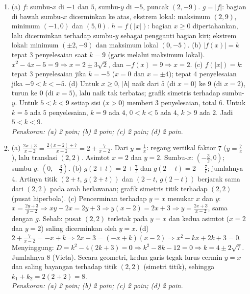 \documentclass[a4paper,11pt]{article}
\begin{document}
\begin{enumerate}[leftmargin=2em,itemsep=3pt,topsep=2pt]
\item[\textbf{3.}] (a) $f$: sumbu-$x$ di $-1$ dan $5$, sumbu-$y$ di $-5$, puncak $(2,-9)$. $g=|f|$: bagian di bawah sumbu-$x$ dicerminkan ke atas, ekstrem lokal: maksimum $(2,9)$, minimum $(-1,0)$ dan $(5,0)$. $h=f(|x|)$: bagian $x\ge0$ dipertahankan, lalu dicerminkan terhadap sumbu-$y$ sebagai pengganti bagian kiri; ekstrem lokal: minimum $(\pm2,-9)$ dan maksimum lokal $(0,-5)$. (b) $|f(x)|=k$ tepat $3$ penyelesaian saat $k=9$ (garis melalui maksimum lokal). $x^2-4x-5=9\Rightarrow x=2\pm3\sqrt2$, dan $-f(x)=9\Rightarrow x=2$. (c) $f(|x|)=k$: tepat $3$ penyelesaian jika $k=-5$ ($x=0$ dan $x=\pm4$); tepat $4$ penyelesaian jika $-9<k<-5$. (d) Untuk $x\ge0$, $|h|$ naik dari $5$ (di $x=0$) ke $9$ (di $x=2$), turun ke $0$ (di $x=5$), lalu naik tak terbatas; grafik simetris terhadap sumbu-$y$. Untuk $5<k<9$ setiap sisi ($x>0$) memberi $3$ penyelesaian, total $6$. Untuk $k=5$ ada $5$ penyelesaian, $k=9$ ada $4$, $0<k<5$ ada $4$, $k>9$ ada $2$. Jadi $5<k<9$. \\ \textit{Penskoran: (a) 2 poin; (b) 2 poin; (c) 2 poin; (d) 2 poin.}
\item[\textbf{4.}] (a) $\frac{2x+3}{x-2}=\frac{2(x-2)+7}{x-2}=2+\frac7{x-2}$. Dari $y=\frac1x$: regang vertikal faktor $7$ ($y=\frac7x$), lalu translasi $(2,2)$. Asimtot $x=2$ dan $y=2$. Sumbu-$x$: $\left(-\frac32,0\right)$; sumbu-$y$: $\left(0,-\frac32\right)$. (b) $g(2+t)=2+\frac7t$ dan $g(2-t)=2-\frac7t$; jumlahnya $4$. Artinya titik $(2+t,\,g(2+t))$ dan $(2-t,\,g(2-t))$ berjarak sama dari $(2,2)$ pada arah berlawanan; grafik simetris titik terhadap $(2,2)$ (pusat hiperbola). (c) Pencerminan terhadap $y=x$ menukar $x$ dan $y$: $x=\frac{2y+3}{y-2}\Rightarrow xy-2x=2y+3\Rightarrow y(x-2)=2x+3\Rightarrow y=\frac{2x+3}{x-2}$, sama dengan $g$. Sebab: pusat $(2,2)$ terletak pada $y=x$ dan kedua asimtot ($x=2$ dan $y=2$) saling dicerminkan oleh $y=x$. (d) $2+\frac7{x-2}=-x+k\Rightarrow2x+3=(-x+k)(x-2)\Rightarrow x^2-kx+2k+3=0$. Menyinggung: $D=k^2-4(2k+3)=0\Rightarrow k^2-8k-12=0\Rightarrow k=4\pm2\sqrt7$. Jumlahnya $8$ (Vieta). Secara geometri, kedua garis tegak lurus cermin $y=x$ dan saling bayangan terhadap titik $(2,2)$ (simetri titik), sehingga $k_1+k_2=2(2+2)=8$. \\ \textit{Penskoran: (a) 2 poin; (b) 2 poin; (c) 2 poin; (d) 2 poin.}

\end{enumerate}
\end{document}
